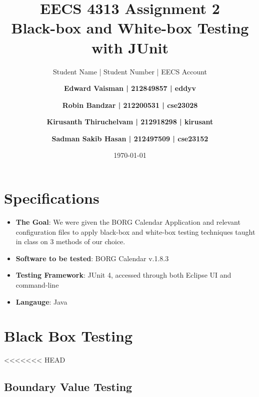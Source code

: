 \documentclass[fontsize=12pt,paper=letter,twoside]{scrartcl}
\author{Student Name | Student Number | EECS Account
\and \textbf{Edward Vaisman | 212849857 | eddyv}
\and \textbf{Robin Bandzar | 212200531 | cse23028}
\and \textbf{Kirusanth Thiruchelvam | 212918298 | kirusant}
\and \textbf{Sadman Sakib Hasan | 212497509 | cse23152}
}
\date{\today} %
\begin{document}
\title{EECS 4313 Assignment 2 \\Black-box and White-box Testing with JUnit}
\maketitle

\newpage

\tableofcontents


\newpage


\section{Specifications}
\begin{itemize}
\item \textbf{The Goal}: We were given the BORG Calendar Application and relevant configuration files to apply black-box and white-box testing techniques taught in class on 3 methods of our choice.
\item \textbf{Software to be tested}: BORG Calendar v.1.8.3
\item \textbf{Testing Framework}: JUnit 4, accessed through both Eclipse UI and command-line
\item \textbf{Langauge}: Java
\end{itemize}

\section{Black Box Testing}

<<<<<<< HEAD
\subsection{Boundary Value Testing}
\end{document}
